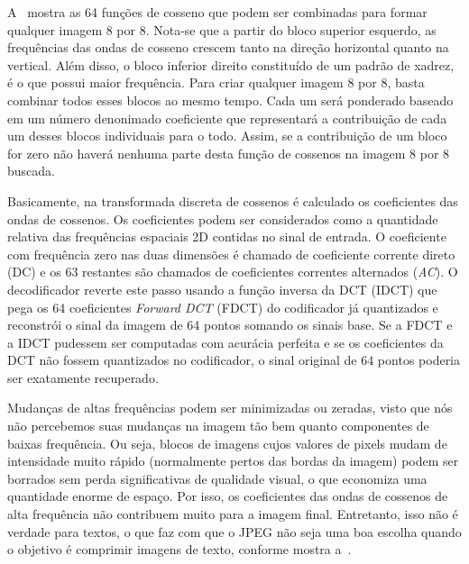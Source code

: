 A~ mostra as 64 funções de cosseno que podem ser combinadas para formar qualquer imagem 8 por 8. Nota-se que a partir do bloco superior esquerdo, as frequências das ondas de cosseno crescem tanto na direção horizontal quanto na vertical. Além disso, o bloco inferior direito constituído de um padrão de xadrez, é o que possui maior frequência. Para criar qualquer imagem 8 por 8, basta combinar todos esses blocos ao mesmo tempo. Cada um será ponderado baseado em um número denonimado coeficiente que representará a contribuição de cada um desses blocos individuais para o todo. Assim, se a contribuição de um bloco for zero não haverá nenhuma parte desta função de cossenos na imagem 8 por 8 buscada. 

Basicamente, na transformada discreta de cossenos é calculado os coeficientes das ondas de cossenos. Os coeficientes podem ser considerados como a quantidade relativa das frequências espaciais 2D contidas no sinal de entrada. O coeficiente com frequência zero nas duas dimensões é chamado de coeficiente corrente direto (\acrshort{DC}) e os 63 restantes são chamados de coeficientes correntes alternados (\textit{AC}). O decodificador reverte este passo usando a função inversa da DCT (\acrshort{IDCT}) que pega os 64 coeficientes \textit{Forward DCT} (\acrshort{FDCT}) do codificador já quantizados e reconstrói o sinal da imagem de 64 pontos somando os sinais base. Se a \acrshort{FDCT} e a \acrshort{IDCT} pudessem ser computadas com acurácia perfeita e se os coeficientes da \acrshort{DCT} não fossem quantizados no codificador, o sinal original de 64 pontos poderia ser exatamente recuperado.


Mudanças de altas frequências podem ser minimizadas ou zeradas, visto que nós não percebemos suas mudanças na imagem tão bem quanto componentes de baixas frequência. Ou seja, blocos de imagens cujos valores de pixels mudam de intensidade muito rápido (normalmente pertos das bordas da imagem) podem ser borrados sem perda significativas de qualidade visual, o que economiza uma quantidade enorme de espaço. Por isso, os coeficientes das ondas de cossenos de alta frequência não contribuem muito para a imagem final. Entretanto, isso não é verdade para textos, o que faz com que o JPEG não seja uma boa escolha quando o objetivo é comprimir imagens de texto, conforme mostra a~.

